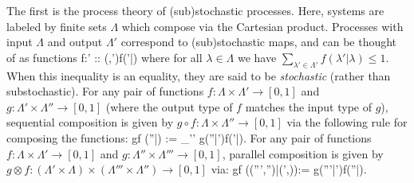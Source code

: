 \documentclass[10pt,twocolumn,aps,groupedaddress,nofootinbib]{revtex4}
\begin{document}
The first is the process theory of (sub)stochastic processes. Here, systems are labeled by finite sets
$\Lambda$ which compose via the Cartesian product. Processes with input $\Lambda$ and output $\Lambda'$ correspond to (sub)stochastic maps, and can be thought of as functions
\beq
f:\Lambda\times\Lambda' \to [0,1] :: (\lambda,\lambda')\mapsto f(\lambda'|\lambda)
\eeq
where for all $\lambda\in\Lambda$ we have $\sum_{\lambda'\in\Lambda'} f(\lambda'|\lambda) \leq 1$. When this inequality is an equality, they are said to be {\em stochastic} (rather than substochastic).
For any pair of functions $f: \Lambda \times \Lambda'\to[0,1]$ and $g: \Lambda' \times \Lambda''\to[0,1]$ (where the output type of $f$ matches the input type of $g$), sequential composition is given by $g \circ f:\Lambda\times\Lambda''\to[0,1]$ via the following rule for composing the functions:
\beq
g\circ f (\lambda''|\lambda) := \sum_{\lambda'\in\Lambda'} g(\lambda''|\lambda')f(\lambda'|\lambda).
\eeq
For any pair of functions $f: \Lambda \times \Lambda'\to[0,1]$ and $g: \Lambda'' \times \Lambda'''\to[0,1]$, parallel composition is given by $g \otimes f:(\Lambda'\times\Lambda) \times (\Lambda'''\times\Lambda'')\to[0,1]$ via:
\beq
g\otimes f ((\lambda''',\lambda'')|(\lambda',\lambda)):= g(\lambda'''|\lambda')f(\lambda''|\lambda).
\eeq
\end{document}
